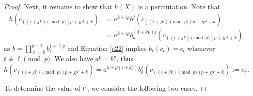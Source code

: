 \documentclass[11pt]{amsart}
\theoremstyle{plain}
\numberwithin{equation}{section}
\begin{document}
\begin{proof}
 

 Next, it remains to show that $h(X)$ is a permutation. Note that
 \begin{equation*}
 \begin{split}
 h(c_{\left((i+jk)\pmod  p\right)p+jp^2+k})&=a^{k+ip}b^{j}(c_{\left((i+jk)\pmod  p\right)p+jp^2+k})
 \\&=a^{k+ip}b_k^{(1+kp)j}(c_{\left((i+jk)\pmod  p\right)p+jp^2+k})
 \end{split}
 \end{equation*}
 as $b=\displaystyle \prod_{\ell=0}^{p-1}b_{\ell}^{1+\ell p}$ and Equation \eqref{e22} implies $b_{\ell}(c_t)=c_t$ whenever $t \not \equiv \ell \pmod  p$. We also have $a^p=b^p$, thus
 \[
  h(c_{\left((i+jk)\pmod  p\right)p+jp^2+k})=a^{k+p(i+kj)}b_k^{j}(c_{\left((i+jk)\pmod  p\right)p+jp^2+k}):=c_{t'}.
 \]
 

To determine the value of $t'$, we consider the following two cases.


\end{proof}
\end{document}
